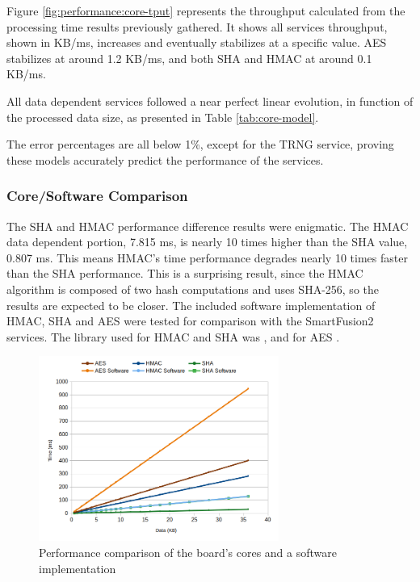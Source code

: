 Figure \ref{fig:performance:core-tput} represents the throughput calculated from the processing time results previously gathered. It shows all services throughput, shown in KB/ms, increases and eventually stabilizes at a specific value. AES stabilizes at around 1.2 KB/ms, and both SHA and HMAC at around 0.1 KB/ms.

All data dependent services followed a near perfect linear evolution, in function of the processed data size, as presented in Table \ref{tab:core-model}.

The error percentages are all below 1\%, except for the TRNG service, proving these models accurately predict the performance of the services.

\subsubsection*{Core/Software Comparison}\label{chap:evaluation:services:software}

The SHA and HMAC performance difference results were enigmatic. The HMAC data dependent portion, 7.815 ms, is nearly 10 times higher than the SHA value, 0.807 ms. This means HMAC's time performance degrades nearly 10 times faster than the SHA performance. This is a surprising result, since the HMAC algorithm is composed of two hash computations and uses SHA-256, so the results are expected to be closer.
The included software implementation of HMAC, SHA and AES were tested for comparison with the SmartFusion2 services. The library used for HMAC and SHA was \cite{ogayHMAC}, and for AES \cite{tinycrypt}. 

\begin{figure}[h!]
	\centering
	\includegraphics[width=0.7\textwidth]{./Images/software-core-time.png}
	\caption{Performance comparison of the board's cores and a software implementation}
	\label{fig:performance:software-core-time}
\end{figure}

